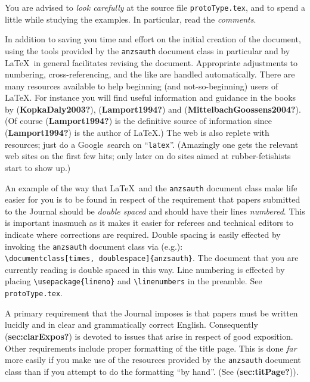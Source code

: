\documentclass[
  times,
  doublespace]{anzsauth}
\begin{document}
You are advised to \emph{look carefully} at the source file
\texttt{protoType.tex}, and to spend a little while studying the
examples. In particular, read the \emph{comments}.

In addition to saving you time and effort on the initial creation of the
document, using the tools provided by the \texttt{anzsauth} document
class in particular and by \LaTeX~in general facilitates revising the
document. Appropriate adjustments to numbering, cross-referencing, and
the like are handled automatically. There are many resources available
to help beginning (and not-so-beginning) users of \LaTeX. For instance
you will find useful information and guidance in the books by
(\textbf{KopkaDaly2003?}), (\textbf{Lamport1994?}) and
(\textbf{MittelbachGoossens2004?}). (Of course (\textbf{Lamport1994?})
is the definitive source of information since (\textbf{Lamport1994?}) is
the author of \LaTeX.) The web is also replete with resources; just do a
Google\texttrademark~search on ``\texttt{latex}''. (Amazingly one gets
the relevant web sites on the first few hits; only later on do sites
aimed at rubber-fetishists start to show up.)

An example of the way that \LaTeX~and the \texttt{anzsauth} document
class make life easier for you is to be found in respect of the
requirement that papers submitted to the Journal should be \emph{double
spaced} and should have their lines \emph{numbered}. This is important
inasmuch as it makes it easier for referees and technical editors to
indicate where corrections are required. Double spacing is easily
effected by invoking the \texttt{anzsauth} document class via (e.g.):
\label{pg:dsln}
\texttt{\textbackslash{}documentclass{[}times,\ doublespace{]}\{anzsauth\}}.
The document that you are currently reading is double spaced in this
way. Line numbering is effected by placing
\texttt{\textbackslash{}usepackage\{lineno\}} and
\texttt{\textbackslash{}linenumbers} in the preamble. See
\texttt{protoType.tex}.

A primary requirement that the Journal imposes is that papers must be
written lucidly and in clear and grammatically correct English.
Consequently (\textbf{sec:clarExpos?}) is devoted to issues that arise
in respect of good exposition. Other requirements include proper
formatting of the title page. This is done \emph{far} more easily if you
make use of the resources provided by the \texttt{anzsauth} document
class than if you attempt to do the formatting ``by hand''. (See
(\textbf{sec:titPage?})).
\end{document}
